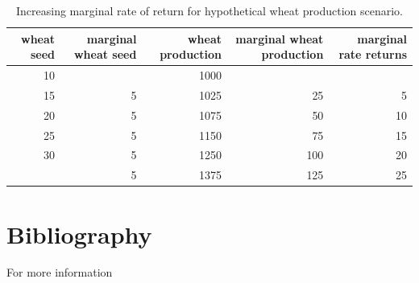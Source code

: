 \documentclass[12pt,ignorenonframetext,aspectratio=169]{beamer}
\begin{document}
\begin{frame}{}
\protect\hypertarget{section-6}{}
\begin{table}

\caption{\label{tab:nitrogen-wheat-imr-tab}Increasing marginal rate of return for hypothetical wheat production scenario.}
\centering
\fontsize{6}{8}\selectfont
\begin{tabular}[t]{rrrrr}
\toprule
wheat seed & marginal wheat seed & wheat production & marginal wheat production & marginal rate returns\\
\midrule
10 &  & 1000 &  & \\
15 & 5 & 1025 & 25 & 5\\
20 & 5 & 1075 & 50 & 10\\
25 & 5 & 1150 & 75 & 15\\
30 & 5 & 1250 & 100 & 20\\
\addlinespace
35 & 5 & 1375 & 125 & 25\\
\bottomrule
\end{tabular}
\end{table}
\end{frame}

\hypertarget{bibliography}{%
\section{Bibliography}\label{bibliography}}

\begin{frame}{For more information}
\protect\hypertarget{for-more-information}{}
\end{frame}
\end{document}
